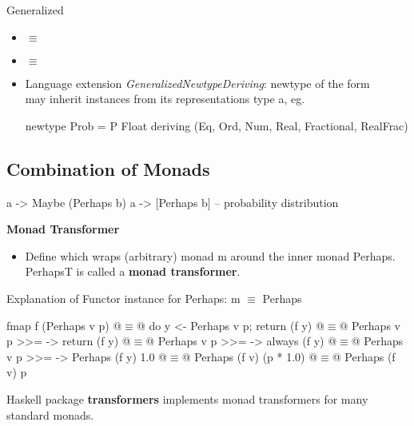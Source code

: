 Generalized 
\begin{itemize}
    \item {} $\equiv$ 
    \item {} $\equiv$ 
\end{itemize}

\begin{itemize}
    \item Language extension \emph{GeneralizedNewtypeDeriving}: newtype of the form \\  may inherit instances from its representations type a, eg.
    \begin{codebox}[haskell]
    newtype Prob = P Float
        deriving (Eq, Ord, Num, Real, Fractional, RealFrac)
    \end{codebox}
\end{itemize}



\subsection*{Combination of Monads}

\begin{codebox}[haskell]
a -> Maybe (Perhaps b)
a -> [Perhaps b] -- probability distribution
\end{codebox}


\textbf{Monad Transformer}
\begin{itemize}
    \item Define  which wraps (arbitrary) monad m around the inner monad Perhaps. PerhapsT is called a \textbf{monad transformer}.
\end{itemize}



Explanation of Functor instance for Perhaps:
m $\equiv$ Perhaps

\begin{codebox}[haskell]
  fmap f (Perhaps v p)
@$\equiv$@ do y <- Perhaps v p; return (f y)
@$\equiv$@ Perhaps v p >>= \y -> return (f y)
@$\equiv$@ Perhaps v p >>= \y -> always (f y)
@$\equiv$@ Perhaps v p >>= \y -> Perhaps (f y) 1.0
@$\equiv$@ Perhaps (f v) (p * 1.0)
@$\equiv$@ Perhaps (f v) p
\end{codebox}

Haskell package \textbf{transformers} implements monad transformers for many standard monads.

















